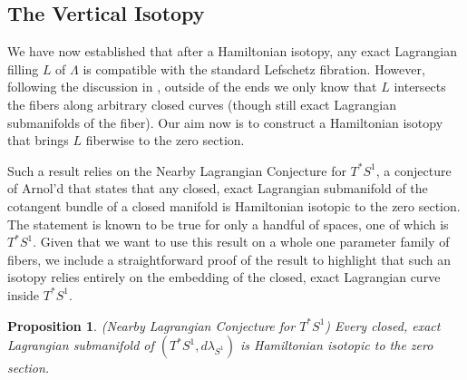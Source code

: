 \documentclass[10pt]{amsart}
\theoremstyle{plain}
\newtheorem{prop}[thm]{Proposition}
\theoremstyle{definition}
\numberwithin{equation}{section}
\begin{document}
\subsection{The Vertical Isotopy}\label{sec:vertiso}
We have now established that after a Hamiltonian isotopy, any exact Lagrangian filling $L$ of $\Lambda$ is compatible with the standard Lefschetz fibration. However, following the discussion in , outside of the ends we only know that $L$ intersects the fibers along arbitrary closed curves (though still exact Lagrangian submanifolds of the fiber). Our aim now is to construct a Hamiltonian isotopy that brings $L$ fiberwise to the zero section. 

Such a result relies on the Nearby Lagrangian Conjecture for $T^*S^1$, a conjecture of Arnol'd that states that any closed, exact Lagrangian submanifold of the cotangent bundle of a closed manifold is Hamiltonian isotopic to the zero section. The statement is known to be true for only a handful of spaces, one of which is $T^* S^1$. Given that we want to use this result on a whole one parameter family of fibers, we include a straightforward proof of the result to highlight that such an isotopy relies entirely on the embedding of the closed, exact Lagrangian curve inside $T^* S^1$.

\begin{prop}\label{lem:NLC}
        (Nearby Lagrangian Conjecture for $T^*S^1$) Every closed, exact Lagrangian submanifold of $(T^*S^1,d\lambda_{S^1})$ is Hamiltonian isotopic to the zero section.
\end{prop}
\end{document}
